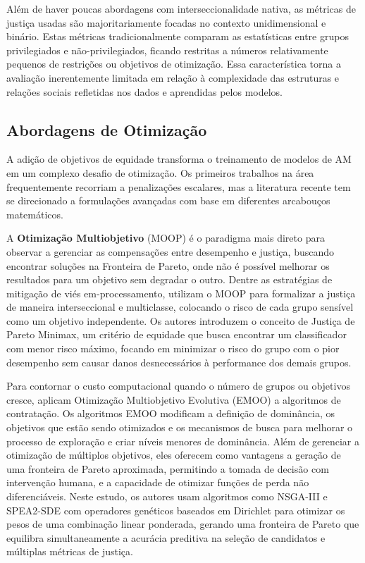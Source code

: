 Além de haver poucas abordagens com interseccionalidade nativa, as métricas de justiça usadas são majoritariamente focadas no contexto unidimensional e binário. Estas métricas tradicionalmente comparam as estatísticas entre grupos privilegiados e não-privilegiados, ficando restritas a números relativamente pequenos de restrições ou objetivos de otimização. Essa característica torna a avaliação inerentemente limitada em relação à complexidade das estruturas e relações sociais refletidas nos dados e aprendidas pelos modelos.

\subsection{Abordagens de Otimização}
A adição de objetivos de equidade transforma o treinamento de modelos de AM em um complexo desafio de otimização. Os primeiros trabalhos na área frequentemente recorriam a penalizações escalares, mas a literatura recente tem se direcionado a formulações avançadas com base em diferentes arcabouços matemáticos.

A \textbf{Otimização Multiobjetivo} (MOOP) é o paradigma mais direto para observar a gerenciar as compensações entre desempenho e justiça, buscando encontrar soluções na Fronteira de Pareto, onde não é possível melhorar os resultados para um objetivo sem degradar o outro. Dentre as estratégias de mitigação de viés em-processamento, \citet{martinez2020minimax} utilizam o MOOP para formalizar a justiça de maneira interseccional e multiclasse, colocando o risco de cada grupo sensível como um objetivo independente. Os autores introduzem o conceito de Justiça de Pareto Minimax, um critério de equidade que busca encontrar um classificador com menor risco máximo, focando em minimizar o risco do grupo com o pior desempenho sem causar danos desnecessários à performance dos demais grupos.

Para contornar o custo computacional quando o número de grupos ou objetivos cresce,
\citet{geden2021fair} aplicam Otimização Multiobjetivo Evolutiva (EMOO) a algoritmos de contratação. Os algoritmos EMOO modificam a definição de dominância, os objetivos que estão sendo otimizados e os mecanismos de busca para melhorar o processo de exploração e criar níveis menores de dominância. Além de gerenciar a otimização de múltiplos objetivos, eles oferecem como vantagens a geração de uma fronteira de Pareto aproximada, permitindo a tomada de decisão com intervenção humana, e a capacidade de otimizar funções de perda não diferenciáveis.
Neste estudo, os autores usam algoritmos como NSGA-III e SPEA2-SDE com operadores genéticos baseados em Dirichlet para otimizar os pesos de uma combinação linear ponderada, gerando uma fronteira de Pareto que equilibra simultaneamente a acurácia preditiva na seleção de candidatos e múltiplas métricas de justiça.

